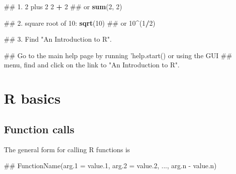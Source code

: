 \documentclass[]{book}
\newenvironment{Shaded}{\begin{snugshade}}{\end{snugshade}}
\newcommand{\KeywordTok}[1]{\textcolor[rgb]{0.13,0.29,0.53}{\textbf{#1}}}
\newcommand{\DecValTok}[1]{\textcolor[rgb]{0.00,0.00,0.81}{#1}}
\newcommand{\StringTok}[1]{\textcolor[rgb]{0.31,0.60,0.02}{#1}}
\newcommand{\OperatorTok}[1]{\textcolor[rgb]{0.81,0.36,0.00}{\textbf{#1}}}
\newcommand{\NormalTok}[1]{#1}
\begin{document}
\begin{Shaded}
\begin{Highlighting}[]
\NormalTok{## 1. 2 plus 2}
\DecValTok{2} \OperatorTok{+}\StringTok{ }\DecValTok{2}
\NormalTok{## or}
\KeywordTok{sum}\NormalTok{(}\DecValTok{2}\NormalTok{, }\DecValTok{2}\NormalTok{)}
\end{Highlighting}
\end{Shaded}

\begin{Shaded}
\begin{Highlighting}[]
\NormalTok{## 2. square root of 10:}
\KeywordTok{sqrt}\NormalTok{(}\DecValTok{10}\NormalTok{)}
\NormalTok{## or}
\DecValTok{10}\OperatorTok{^}\NormalTok{(}\DecValTok{1}\OperatorTok{/}\DecValTok{2}\NormalTok{)}
\end{Highlighting}
\end{Shaded}

\begin{Shaded}
\begin{Highlighting}[]
\NormalTok{## 3. Find "An Introduction to R".}
\end{Highlighting}
\end{Shaded}

\begin{Shaded}
\begin{Highlighting}[]
\NormalTok{## Go to the main help page by running 'help.start() or using the GUI}
\NormalTok{## menu, find and click on the link to "An Introduction to R".}
\end{Highlighting}
\end{Shaded}

\chapter{R basics}\label{r-basics}

\section{Function calls}\label{function-calls}

The general form for calling R functions is

\begin{Shaded}
\begin{Highlighting}[]
\NormalTok{## FunctionName(arg.1 = value.1, arg.2 = value.2, ..., arg.n - value.n)}
\end{Highlighting}
\end{Shaded}
\end{document}

